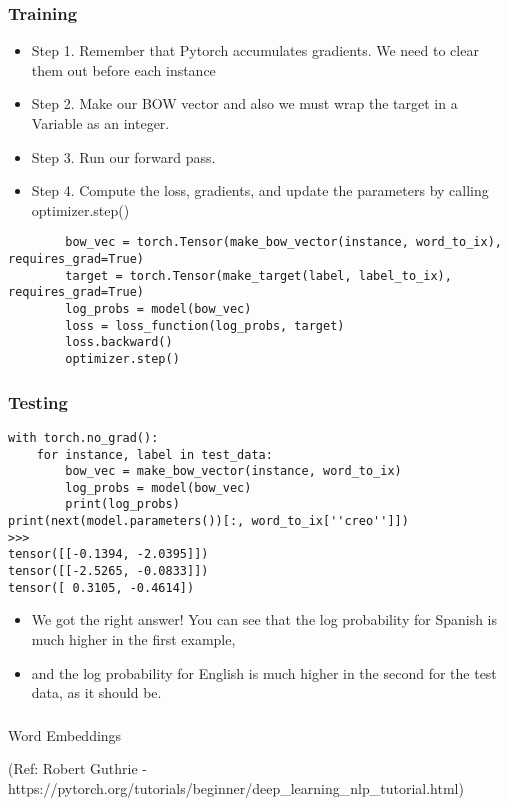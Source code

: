 \begin{frame}[fragile]
\frametitle{Training}

\begin{itemize}
\item Step 1. Remember that Pytorch accumulates gradients.  We need to clear them out before each instance
\item Step 2. Make our BOW vector and also we must wrap the target in a Variable as an integer.
\item Step 3. Run our forward pass.
\item Step 4. Compute the loss, gradients, and update the parameters by calling optimizer.step()
\end{itemize}
 \begin{lstlisting}
        bow_vec = torch.Tensor(make_bow_vector(instance, word_to_ix), requires_grad=True)
        target = torch.Tensor(make_target(label, label_to_ix), requires_grad=True)
        log_probs = model(bow_vec)
        loss = loss_function(log_probs, target)
        loss.backward()
        optimizer.step()        
\end{lstlisting}              
\end{frame} 

\begin{frame}[fragile]
\frametitle{Testing}

 \begin{lstlisting}
with torch.no_grad():
    for instance, label in test_data:
        bow_vec = make_bow_vector(instance, word_to_ix)
        log_probs = model(bow_vec)
        print(log_probs)
print(next(model.parameters())[:, word_to_ix[''creo'']])   
>>>
tensor([[-0.1394, -2.0395]])
tensor([[-2.5265, -0.0833]])
tensor([ 0.3105, -0.4614])
\end{lstlisting}  
\begin{itemize}
\item We got the right answer! You can see that the log probability for Spanish is much higher in the first example, 
\item and the log probability for English is much higher in the second for the test data, as it should be.
\end{itemize}            
\end{frame} 

\begin{frame}[fragile]\frametitle{}

\begin{center}
{\Large Word Embeddings}

(Ref:  Robert Guthrie -  https://pytorch.org/tutorials/beginner/deep\_learning\_nlp\_tutorial.html)
\end{center}
\end{frame}


